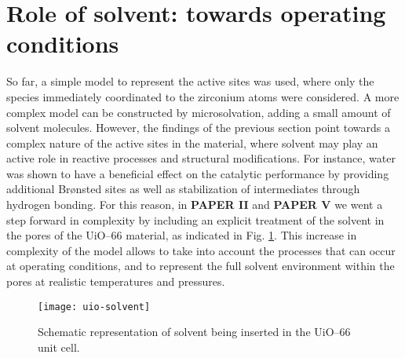 \section{Role of solvent: towards operating conditions}
So far, a simple model to represent the active sites was used, where only the species immediately coordinated to the zirconium atoms were considered. A more complex model can be constructed by microsolvation, adding a small amount of solvent molecules. However, the findings of the previous section point towards a complex nature of the active sites in the material, where solvent may play an active role in reactive processes and structural modifications. 
For instance, water was shown to have a beneficial effect on the catalytic performance by providing additional Br\o{}nsted sites as well as stabilization of intermediates through hydrogen bonding. For this reason, in \textbf{PAPER II} and \textbf{PAPER V} we went a step forward in complexity by including an explicit treatment of the solvent in the pores of the UiO--66 material, as indicated in Fig. \ref{fig:uio-solvent}. This increase in complexity of the model allows to take into account the processes that can occur at operating conditions, and to represent the full solvent environment within the pores at realistic temperatures and pressures.

\begin{figure}[!htbp]
	\centering
	\texttt{[image: uio-solvent]}
	\caption{Schematic representation of solvent being inserted in the UiO--66 unit cell.}
	\label{fig:uio-solvent}
\end{figure}

